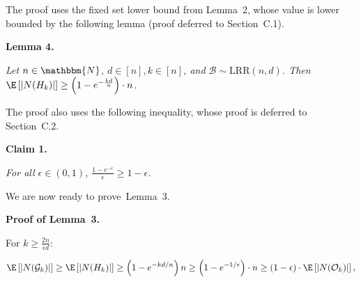 \documentclass[10pt,a4paper]{article}
\begin{document}



The proof uses the fixed set lower bound from Lemma 2, whose value is lower bounded by the following lemma (proof deferred to Section C.1).\par





\par\medskip\noindent\textbf{\textbf{Lemma 4}\textbf{.}}\par



\emph{Let $n\in\mathbbm{N}$, $d\in[n],k\in[n]$, and $\mathcal{B}\sim\text{{LRR}}(n,d)$.
Then $\E\left[|N(H_{k})|\right]\geq\left(1-e^{-\frac{kd}{n}}\right)\cdot n$.}\par






The proof also uses the following inequality, whose proof is deferred to Section C.2.\par





\par\medskip\noindent\textbf{\textbf{Claim 1}\textbf{.}}\par



\emph{For all $\epsilon\in(0,1)$, $\frac{1-e^{-\epsilon}}{\epsilon}\geq 1-\epsilon$.}\par






We are now ready to prove Lemma 3.\par




\par\medskip\noindent\textbf{Proof of Lemma 3.}\par



For $k\geq\frac{2n}{\epsilon d}$:\par


\[\begin{gathered}
\displaystyle\E\left[|N(\mathcal{G}_{k})|\right]\geq\E\left[|N(H_{k})|\right]\geq\left(1-e^{-kd/n}\right)n\geq\left(1-e^{-1/\epsilon}\right)\cdot n\geq\left(1-\epsilon\right)\cdot\E\left[|N(\mathcal{O}_{k})|\right],
\end{gathered}\]
\end{document}
